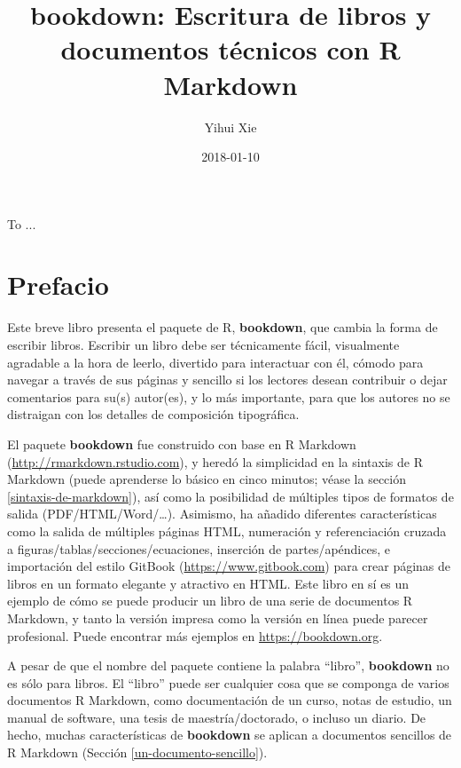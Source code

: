 \documentclass[12pt,]{krantz}
\title{bookdown: Escritura de libros y documentos técnicos con R Markdown}
\author{Yihui Xie}
\date{2018-01-10}
\theoremstyle{definition}
\theoremstyle{definition}
\theoremstyle{definition}
\theoremstyle{remark}
\begin{document}
\maketitle

\cleardoublepage\newpage\thispagestyle{empty}\null
\cleardoublepage\newpage\thispagestyle{empty}
\begin{center}
To ...
\end{center}

\setlength{\abovedisplayskip}{-5pt}
\frontmatter

{
\hypersetup{linkcolor=black}
\setcounter{tocdepth}{2}
\tableofcontents
}
\listoftables
\listoffigures
\chapter*{Prefacio}\label{prefacio}


Este breve libro presenta el paquete de R, \textbf{bookdown}, que cambia
la forma de escribir libros. Escribir un libro debe ser técnicamente
fácil, visualmente agradable a la hora de leerlo, divertido para
interactuar con él, cómodo para navegar a través de sus páginas y
sencillo si los lectores desean contribuir o dejar comentarios para
su(s) autor(es), y lo más importante, para que los autores no se
distraigan con los detalles de composición tipográfica.

El paquete \textbf{bookdown} fue construido con base en R Markdown
(\url{http://rmarkdown.rstudio.com}), y heredó la simplicidad en la
sintaxis de R Markdown (puede aprenderse lo básico en cinco minutos;
véase la sección \ref{sintaxis-de-markdown}), así como la posibilidad de
múltiples tipos de formatos de salida (PDF/HTML/Word/\ldots{}).
Asimismo, ha añadido diferentes características como la salida de
múltiples páginas HTML, numeración y referenciación cruzada a
figuras/tablas/secciones/ecuaciones, inserción de partes/apéndices, e
importación del estilo GitBook 
(\url{https://www.gitbook.com}) para crear páginas de libros en un
formato elegante y atractivo en HTML. Este libro en sí es un ejemplo de
cómo se puede producir un libro de una serie de documentos R Markdown, y
tanto la versión impresa como la versión en línea puede parecer
profesional. Puede encontrar más ejemplos en \url{https://bookdown.org}.

A pesar de que el nombre del paquete contiene la palabra ``libro'',
\textbf{bookdown} no es sólo para libros. El ``libro'' puede ser
cualquier cosa que se componga de varios documentos R Markdown, como
documentación de un curso, notas de estudio, un manual de software, una
tesis de maestría/doctorado, o incluso un diario. De hecho, muchas
características de \textbf{bookdown} se aplican a documentos sencillos
de R Markdown (Sección \ref{un-documento-sencillo}).
\end{document}
